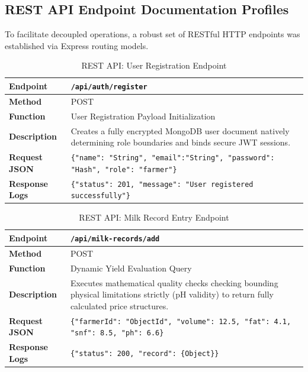 \documentclass[12pt,a4paper]{report}
\begin{document}
\subsection{REST API Endpoint Documentation Profiles}
\renewcommand{\arraystretch}{1.5}
To facilitate decoupled operations, a robust set of RESTful HTTP endpoints was established via Express routing models.

\vspace{0.4cm}
\begin{table}[htbp]
\centering
\begin{tabular}{|p{3cm}|p{11cm}|}
\hline
\textbf{Endpoint} & \texttt{/api/auth/register} \\ \hline
\textbf{Method} & POST \\ \hline
\textbf{Function} & User Registration Payload Initialization \\ \hline
\textbf{Description} & Creates a fully encrypted MongoDB user document natively determining role boundaries and binds secure JWT sessions. \\ \hline
\textbf{Request JSON} & \texttt{\{"name": "String", "email":"String", "password": "Hash", "role": "farmer"\}} \\ \hline
\textbf{Response Logs} & \texttt{\{"status": 201, "message": "User registered successfully"\}} \\ \hline
\end{tabular}
\caption{REST API: User Registration Endpoint}
\end{table}
\vspace{0.4cm}

\vspace{0.4cm}
\begin{table}[htbp]
\centering
\begin{tabular}{|p{3cm}|p{11cm}|}
\hline
\textbf{Endpoint} & \texttt{/api/milk-records/add} \\ \hline
\textbf{Method} & POST \\ \hline
\textbf{Function} & Dynamic Yield Evaluation Query \\ \hline
\textbf{Description} & Executes mathematical quality checks checking bounding physical limitations strictly (pH validity) to return fully calculated price structures. \\ \hline
\textbf{Request JSON} & \texttt{\{"farmerId": "ObjectId", "volume": 12.5, "fat": 4.1, "snf": 8.5, "ph": 6.6\}} \\ \hline
\textbf{Response Logs} & \texttt{\{"status": 200, "record": \{Object\}\}} \\ \hline
\end{tabular}
\caption{REST API: Milk Record Entry Endpoint}
\end{table}
\vspace{0.4cm}
\end{document}
